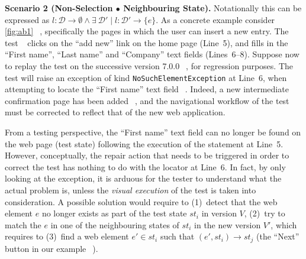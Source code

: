
\noindent
\textbf{Scenario 2 (Non-Selection $\bullet$ Neighbouring State).}
Notationally this can be expressed as $l: \mathcal{D} \rightarrow \emptyset \land \exists \ \mathcal{D'} \mid l: \mathcal{D'} \rightarrow \{e\}$.
As a concrete example consider \autoref{fig:ab1}~\textcircled{}, %
specifically the pages in which the user can insert a new entry. The test~\textcircled{} clicks on the ``add new'' link on the home page (Line~5), and fills in the ``First name'', ``Last name'' and ``Company'' text fields (Lines~6--8).
Suppose now to replay the test on the successive version 7.0.0~\textcircled{}, for regression purposes. The test will raise an exception of kind \texttt{NoSuchElementException} at Line~6, when attempting to locate the ``First name'' text field~\textcircled{}. 
Indeed, a new intermediate confirmation page has been added~\textcircled{}, and the navigational workflow of the test must be corrected to reflect that of the new  web application.

From a testing perspective, the ``First name'' text field can no longer be found on the web page (test state) following the execution of the statement at Line~5. However, conceptually, the repair action that needs to be triggered in order to correct the test has nothing to do with the locator at Line~6.
In fact, by only looking at the exception, it is arduous for the tester to understand what the actual problem is, unless the \textit{visual execution} of the test is taken into consideration.
%
%
A possible solution would require to (1)~detect that the web element $e$ no longer exists as part of the test state $st_i$ in version $V$, (2)~try to match the $e$ in one of the neighbouring states of $st_i$ in the new version $V'$, which requires to (3)~find  a web element $e' \in st_i$ such that $(e', st_i) \rightarrow st_j$ (the ``Next'' button in our example~\textcircled{}).

